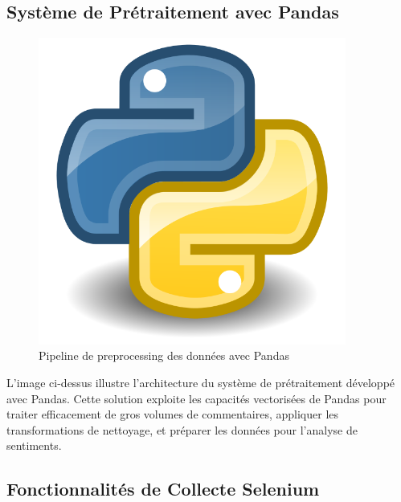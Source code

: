 \subsection{Système de Prétraitement avec Pandas}

\begin{figure}[H]
\centering
\includegraphics[width=0.9\textwidth]{assets/images/python.png}
\caption{Pipeline de preprocessing des données avec Pandas}
\label{fig:pandas-preprocessing}
\end{figure}

L'image ci-dessus illustre l'architecture du système de prétraitement développé avec Pandas. Cette solution exploite les capacités vectorisées de Pandas pour traiter efficacement de gros volumes de commentaires, appliquer les transformations de nettoyage, et préparer les données pour l'analyse de sentiments.

\subsection{Fonctionnalités de Collecte Selenium}

